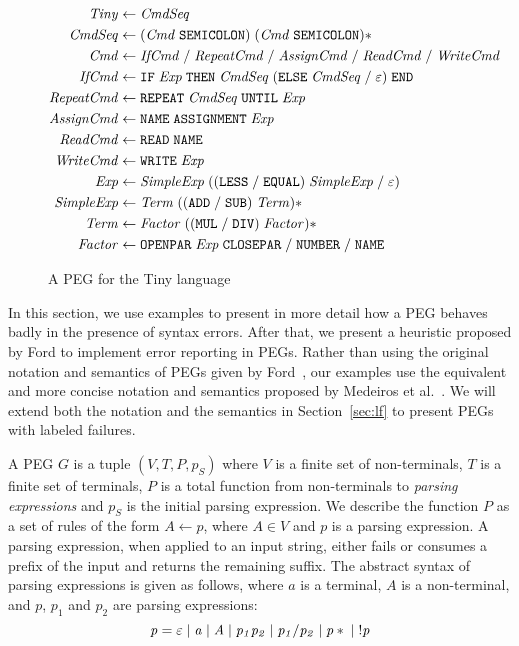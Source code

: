 \documentclass[3p,12pt,singlecolumn]{elsarticle}
\begin{document}
\begin{figure}[t]
\begin{align*}
\it{Tiny} & \leftarrow \it{CmdSeq}\\
\it{CmdSeq} & \leftarrow \it{(Cmd \; {\tt SEMICOLON}) \;
  (Cmd \; {\tt SEMICOLON})*}\\
\it{Cmd} & \leftarrow \it{IfCmd \; / \; RepeatCmd \; / \;
  AssignCmd \; / \; ReadCmd \; / \; WriteCmd}\\
\it{IfCmd} & \leftarrow \it{{\tt IF} \; Exp \; {\tt THEN} \; CmdSeq
  \; ({\tt ELSE} \; CmdSeq \; / \; \varepsilon) \; {\tt END}}\\
\it{RepeatCmd} & \leftarrow \it{{\tt REPEAT} \; CmdSeq \;
  {\tt UNTIL} \; Exp}\\
\it{AssignCmd} & \leftarrow \it{{\tt NAME} \; {\tt ASSIGNMENT} \; Exp}\\
\it{ReadCmd} & \leftarrow \it{{\tt READ} \; {\tt NAME}}\\
\it{WriteCmd} & \leftarrow \it{{\tt WRITE} \; Exp}\\
\it{Exp} & \leftarrow \it{SimpleExp \;
  (({\tt LESS} \; / \; {\tt EQUAL}) \; SimpleExp \; / \; \varepsilon})\\
\it{SimpleExp} & \leftarrow \it{Term \;
  (({\tt ADD} \; / \; {\tt SUB}) \; Term)*}\\
\it{Term} & \leftarrow \it{Factor \;
  (({\tt MUL} \; / \; {\tt DIV}) \; Factor)*}\\
\it{Factor} & \leftarrow \it{{\tt OPENPAR} \; Exp \; {\tt CLOSEPAR}
  \; / \; {\tt NUMBER} \; / \; {\tt NAME}}
\end{align*}
\caption{A PEG for the Tiny language}
\label{fig:tiny}
\end{figure}

In this section, we use examples to present in more detail how a
PEG behaves badly in the presence of syntax errors.
After that, we present a heuristic proposed by Ford
\cite{ford2002packrat} to implement error reporting in PEGs.
Rather than using the original notation and semantics of PEGs 
given by Ford~\cite{ford2004peg}, our examples use the
equivalent and more concise notation and semantics proposed
by Medeiros et al.~\cite{medeiros2011re2peg,medeiros2012left,mascarenhas2014}.
We will extend both the notation and the semantics in Section~\ref{sec:lf}
to present PEGs with labeled failures.

A PEG $G$ is a tuple $(V,T,P,p_{S})$ where $V$ is a finite set of
non-terminals, $T$ is a finite set of terminals, $P$ is a total
function from non-terminals to \emph{parsing expressions} and $p_{S}$
is the initial parsing expression.
We describe the function $P$ as a set of rules of the form
$A \leftarrow p$, where $A \in V$ and $p$ is a parsing
expression.
A parsing expression, when applied to an input string, either
fails or consumes a prefix of the input and returns the
remaining suffix. The abstract syntax of parsing expressions is
given as follows, where $a$ is a terminal, $A$ is a non-terminal,
and $p$, $p_1$ and $p_2$ are parsing expressions:
\[\it{
p = \varepsilon \; | \; a \; | \; A \; | \; p_1 p_2 \; | \;
  p_1 / p_2 \; | \; p* \; | \; !p
}\]
\end{document}
